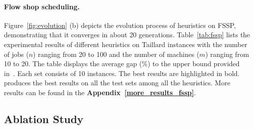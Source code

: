\paragraph{Flow shop scheduling.}
Figure~\ref{fig:evolution} (b) depicts the evolution process of heuristics on FSSP, demonstrating that it converges in about 20 generations. Table~\ref{tab:fssp} lists the experimental results of different heuristics on Taillard instances with the number of jobs ($n$) ranging from 20 to 100 and the number of machines ($m$) ranging from 10 to 20. The table displays the average gap (\%) to the upper bound provided in~\citet{taillard1993benchmarks}. Each set consists of 10 instances. The best results are highlighted in bold. \ourmethod{} produces the best results on all the test sets among all the heuristics. More results can be found in the \textbf{Appendix~\ref{more_results_fssp}}.

\subsection{Ablation Study}

